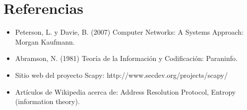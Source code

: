 \documentclass{article}
\begin{document}
\section{Referencias}
\begin{itemize}
    \item Peterson, L. y Davie, B. (2007) Computer Networks: A Systems
        Approach: Morgan Kaufmann.
    \item Abramson, N. (1981) Teoría de la Información y Codificación:
        Paraninfo.
    \item Sitio web del proyecto Scapy: http://www.secdev.org/projects/scapy/
    \item Artículos de Wikipedia acerca de: Address Resolution Protocol, 
        Entropy (information theory).
\end{itemize}
\end{document}
